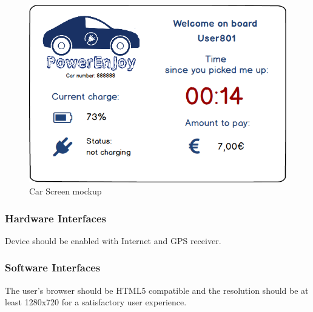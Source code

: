 \vspace{80pt}

\begin{figure}[htbp]
\centering
\includegraphics[width=\textwidth]{Images/Mockups/CarScreen}
\caption{Car Screen mockup}
\label{fig:car}
\end{figure}
\clearpage

\subsubsection{Hardware Interfaces} \label{hw_interfaces}
Device should be enabled with Internet and GPS receiver.

\subsubsection{Software Interfaces} \label{sw_interfaces}
The user's browser should be HTML5 compatible and the resolution should be at least 1280x720 for a satisfactory user experience.



